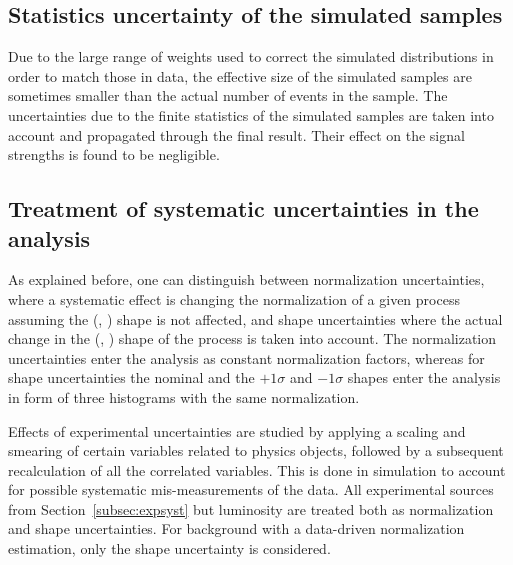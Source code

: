 \subsection{Statistics uncertainty of the simulated samples}

Due to the large range of weights used to correct the simulated distributions in order to
match those in data, the effective size of the simulated samples are sometimes smaller than
the actual number of events in the sample.
The uncertainties due to the finite statistics of the simulated samples are taken into account and propagated through the final result. Their effect on the signal strengths is found to be negligible.

\subsection{Treatment of systematic uncertainties in the analysis}\label{sec:syst_treatment}

As explained before, one can distinguish between normalization uncertainties, where a systematic effect is changing the normalization of a given process assuming the (\mll, \mt) shape is not affected, and shape uncertainties where the actual change in the (\mll, \mt) shape of the process is taken into account. The normalization uncertainties enter the analysis as constant normalization factors, whereas for shape uncertainties the nominal and the $+1\sigma$ and $-1\sigma$ shapes enter the analysis in form of three histograms with the same normalization. 

Effects of experimental uncertainties are studied by applying a scaling and smearing of certain variables related to physics objects, followed by a subsequent recalculation of all the correlated variables. This is done in simulation to account for possible systematic mis-measurements of the data. All experimental sources from Section~\ref{subsec:expsyst} but luminosity are treated both as normalization and shape uncertainties. For background with a data-driven normalization estimation, only the shape uncertainty is considered.
